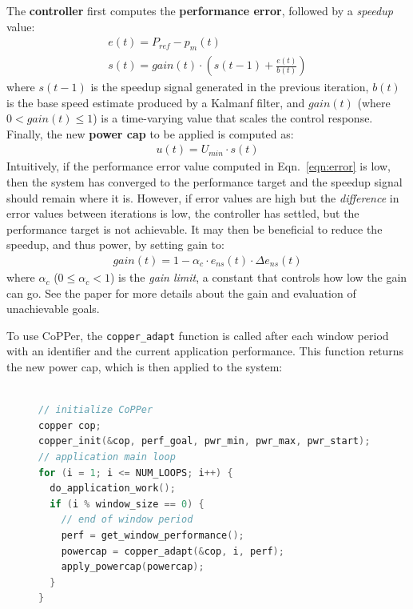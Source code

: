 \documentclass[a0,portrait]{a0poster}
\renewcommand{\small}{\fontsize{24.88}{30}\selectfont}
\newcommand{\SYSTEM}{CoPPer}
\newcommand{\eqnref}[1]{Eqn.~\ref{eqn:#1}}
\newcommand{\function}[1]{\mbox{\texttt{#1}}}
\begin{document}
\begin{multicols}{2}
The \textbf{controller} first computes the \textbf{performance error}, followed by a \emph{speedup} value:
\begin{eqnarray}
  e(t) = P_{ref} - p_m(t)
  \label{eqn:error} \\
  s(t) = gain(t) \cdot \left(s(t-1) + \frac{e(t)}{b(t)}\right)
  \label{eqn:speedup-control}
\end{eqnarray}
where $s(t-1)$ is the speedup signal generated in the previous
iteration, $b(t)$ is the base speed estimate produced by a Kalmanf
filter, and $gain(t)$ (where $0 < gain(t) \le 1$) is a time-varying
value that scales the control response.
Finally, the new \textbf{power cap} to be applied is computed as:
\begin{eqnarray}
  u(t) = U_{min} \cdot s(t)
  \label{eqn:new-powercap}
\end{eqnarray}
Intuitively, if the performance error value computed in \eqnref{error} is low, then the system
has converged to the performance target and the speedup signal should
remain where it is.  However, if error values are high but the
\emph{difference} in error values between iterations is low, the controller
has settled, but the performance target is not achievable.  It
may then be beneficial to reduce the speedup, and thus power, by setting gain to:
\begin{eqnarray}
  gain(t) = 1 - \alpha_c \cdot e_{ns}(t) \cdot \Delta e_{ns}(t)
  \label{eqn:cost-pole}
\end{eqnarray}
where $\alpha_c$ ($0 \le \alpha_c < 1$) is the \emph{gain limit}, a
constant that controls how low the gain can go.
See the paper for more details about the gain and evaluation of unachievable goals.

To use \SYSTEM{}, the \function{copper\_adapt} function is called after each window period with an identifier and the current application performance.
This function returns the new power cap, which is then applied to the system:

\begin{figure}[H]
\small
\begin{minipage}[t]{.95\columnwidth}
%
\begin{lstlisting}[language=C,%
  caption={Using \SYSTEM{} to compute and apply power caps.},%
  morekeywords={uint64_t, uint32_t, hbsc_ctx, raplcap, raplcap_limit, copper},%
  label={lst:example-copper}]%

// initialize CoPPer
copper cop;
copper_init(&cop, perf_goal, pwr_min, pwr_max, pwr_start);
// application main loop
for (i = 1; i <= NUM_LOOPS; i++) {
  do_application_work();
  if (i % window_size == 0) {
    // end of window period
    perf = get_window_performance();
    powercap = copper_adapt(&cop, i, perf);
    apply_powercap(powercap);
  }
}
\end{lstlisting}
\end{minipage}
\end{figure}


\end{multicols}
\end{document}
